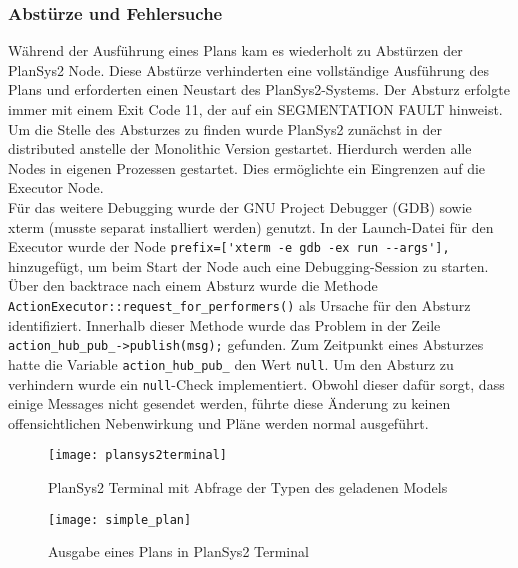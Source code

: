 \subsubsection{Abstürze und Fehlersuche}
Während der Ausführung eines Plans kam es wiederholt zu Abstürzen der \ac{PlanSys2} Node.
Diese Abstürze verhinderten eine vollständige Ausführung des Plans und erforderten einen Neustart des \ac{PlanSys2}-Systems.
Der Absturz erfolgte immer mit einem Exit Code 11, der auf ein SEGMENTATION FAULT hinweist.
Um die Stelle des Absturzes zu finden wurde \ac{PlanSys2} zunächst in der distributed anstelle der Monolithic Version gestartet.
Hierdurch werden alle Nodes in eigenen Prozessen gestartet.
Dies ermöglichte ein Eingrenzen auf die Executor Node.\\
Für das weitere Debugging wurde der GNU Project Debugger (GDB) sowie xterm (musste separat installiert werden) genutzt.
In der Launch-Datei für den Executor wurde der Node \verb|prefix=['xterm -e gdb -ex run --args'],| hinzugefügt, um beim Start der Node auch eine Debugging-Session zu starten.\\
Über den backtrace nach einem Absturz wurde die Methode\\\verb|ActionExecutor::request_for_performers()| als Ursache für den Absturz identifiziert.
Innerhalb dieser Methode wurde das Problem in der Zeile\\\verb|action_hub_pub_->publish(msg);| gefunden.
Zum Zeitpunkt eines Absturzes hatte die Variable \verb|action_hub_pub_| den Wert \verb|null|.
Um den Absturz zu verhindern wurde ein \verb|null|-Check implementiert.
Obwohl dieser dafür sorgt, dass einige Messages nicht gesendet werden, führte diese Änderung zu keinen offensichtlichen Nebenwirkung und Pläne werden normal ausgeführt.

\begin{figure}[ht!]
    \centering
    \texttt{[image: plansys2terminal]}
    \caption{\ac{PlanSys2} Terminal mit Abfrage der Typen des geladenen Models}
    \label{fig:plansysterminal}
\end{figure}

\begin{figure}[ht!]
    \centering
    \texttt{[image: simple\_plan]}
    \caption{Ausgabe eines Plans in \ac{PlanSys2} Terminal}
    \label{fig:terminalplan}
\end{figure}